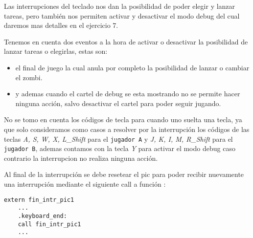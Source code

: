 	Las interrupciones del teclado nos dan la posibilidad de poder elegir y lanzar tareas, pero también nos permiten activar y desactivar el modo debug del cual daremos mas detalles en el ejercicio 7.

	Tenemos en cuenta dos eventos a la hora de activar o desactivar la posibilidad de lanzar tareas o elegirlas, estas son: 
	\begin{itemize}
		\item el final de juego la cual anula por completo la posibilidad de lanzar o cambiar el zombi.

		\item y ademas cuando el cartel de debug se esta mostrando no se permite hacer ninguna acción, salvo desactivar el cartel para poder seguir jugando.
	\end{itemize}

	No se tomo en cuenta los códigos de tecla para cuando uno suelta una tecla, ya que solo consideramos como casos a resolver por la interrupción los códigos de las teclas \textit{A, S, W, X, L\_Shift} para el \texttt{jugador A} y \textit{J, K, I, M, R\_Shift} para el \texttt{jugador B}, ademas contamos con la tecla \textit{Y} para activar el modo debug caso contrario la interrupcion no realiza ninguna acción.

	Al final de la interrupción se debe resetear el pic para poder recibir nuevamente una interrupción mediante el siguiente call a función :

	\begin{lstlisting}
extern fin_intr_pic1
	...
	.keyboard_end:
	call fin_intr_pic1
	...	
	\end{lstlisting}
